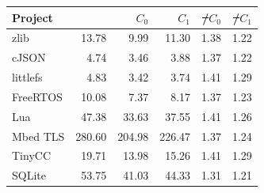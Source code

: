 \begin{table}[t!]
\label{tab:instr}
\centering
\setlength{\tabcolsep}{3pt}
\begin{tabular}{|l|r|r|r|r|r|}
\hline
Project & \st & $C_0$ & $C_1$ & \st/$C_0$ & \st/$C_1$ \\
\hline
zlib & 13.78 & 9.99 & 11.30 & 1.38 & 1.22 \\
cJSON & 4.74 & 3.46 & 3.88 & 1.37 & 1.22 \\
littlefs & 4.83 & 3.42 & 3.74 & 1.41 & 1.29 \\
FreeRTOS & 10.08 & 7.37 & 8.17 & 1.37 & 1.23 \\
Lua & 47.38 & 33.63 & 37.55 & 1.41 & 1.26 \\
Mbed TLS & 280.60 & 204.98 & 226.47 & 1.37 & 1.24 \\
TinyCC & 19.71 & 13.98 & 15.26 & 1.41 & 1.29 \\
SQLite & 53.75 & 41.03 & 44.33 & 1.31 & 1.21 \\
\hline
\end{tabular}
\end{table}

